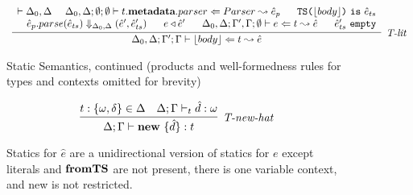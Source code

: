 \begin{figure}
\[\begin{array}{c}
\infer[\textit{T-lit}]
	  {\Delta_0, \Delta; \Gamma'; \Gamma \vdash \lfloor body \rfloor \Leftarrow t \leadsto \hat{e} }
	  {\renewcommand{\arraystretch}{1}
	    \begin{array}{r}
	    \vdash \Delta_0, \Delta ~~~~ \Delta_0, \Delta ;\emptyset; \emptyset \vdash t.\keyw{metadata}.parser\Leftarrow Parser \leadsto \hat{e}_p ~~~~~ \texttt{TS(}\lfloor body \rfloor \texttt{)}\ \texttt{is}\ \hat{e}_{ts}\\
            \hat{e}_p.parse(\hat{e}_{ts}) \Downarrow_{\Delta_0, \Delta} (\hat{e}', \hat e_{ts}') ~~~~~  e \triangleleft  \hat{e}'~~~~~ \Delta_0, \Delta;\Gamma', \Gamma; \emptyset\vdash e\Leftarrow t \leadsto \hat{e} ~~~~~ \hat e_{ts}'\ \texttt{empty}
            \end{array}
       }
\end{array}
\]
\vspace{-10px}
\label{fig:statics2}
\caption{Static Semantics, continued (products and well-formedness rules for types and contexts omitted for brevity) }
\vspace{-10px}
\end{figure}

\begin{figure}
\centering
\[
\infer[\textit{T-new-hat}]
	{\Delta; \Gamma \vdash \keyw{new}\ \{ \hat d \} :  t }
	{ t:\{\omega, \delta\} \in \Delta & \Delta; \Gamma \vdash_t \hat d : \omega}
\]
\vspace{-15px}
\caption{Statics for $\hat e$ are a unidirectional version of statics for $e$ except literals and $\textbf{fromTS}$ are not present, there is one variable context, and new is not restricted.}
\vspace{-10px}
\label{fig:staticsHat}
\end{figure}

